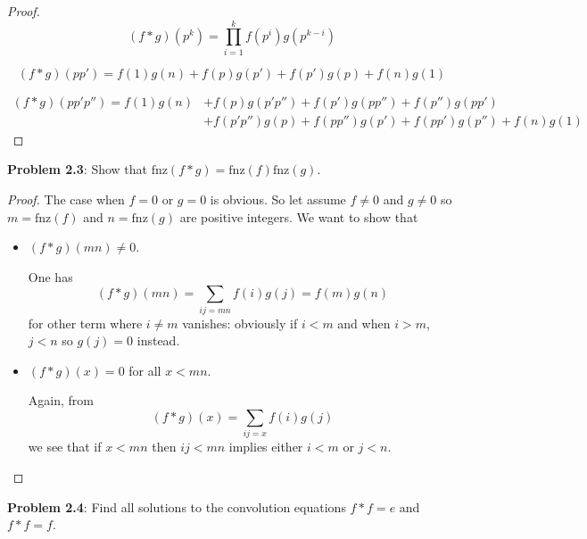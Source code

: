 \documentclass{article}
\newcommand{\fnz}{\text{fnz}}
\begin{document}
\begin{proof}
$$(f*g)(p^k) = \prod_{i=1}^{k} f(p^i) g(p^{k - i})$$

$$(f*g)(p p') = f(1) g(n) + f(p) g(p') + f(p') g(p) + f(n) g(1)$$

\begin{align*}
(f*g)(p p' p'') = f(1) g(n) &+ f(p) g(p' p'') + f(p') g(p p'') + f(p'') g(p p')\\
&+  f(p' p'') g(p)  + f(p p'') g(p')  +  f(p p') g(p'') + f(n) g(1)
\end{align*}
\end{proof}

\textbf{Problem 2.3}: Show that $\fnz(f * g) = \fnz(f) \fnz(g)$.

\begin{proof}

The case when $f = 0$ or $g = 0$ is obvious. So let assume $f \not= 0$ and $g \not= 0$ so $m = \fnz(f)$ and $n = \fnz(g)$ are positive integers. We want to show that
\begin{itemize}
\item $(f * g)(mn) \not= 0$.

One has
$$(f * g)(mn) = \sum_{ij = mn} f(i) g(j) = f(m) g(n)$$
for other term where $i \not= m$ vanishes: obviously if $i < m$ and when $i > m$, $j < n$ so $g(j) = 0$ instead.

\item $(f * g)(x) = 0$ for all $x < mn$.

Again, from
$$(f * g)(x) = \sum_{ij = x} f(i) g(j)$$
we see that if $x < mn$ then $ij < mn$ implies either $i < m$ or $j < n$.

\end{itemize}
\end{proof}

\textbf{Problem 2.4}: Find all solutions to the convolution equations $f * f = e$ and $f * f = f$.
\end{document}
